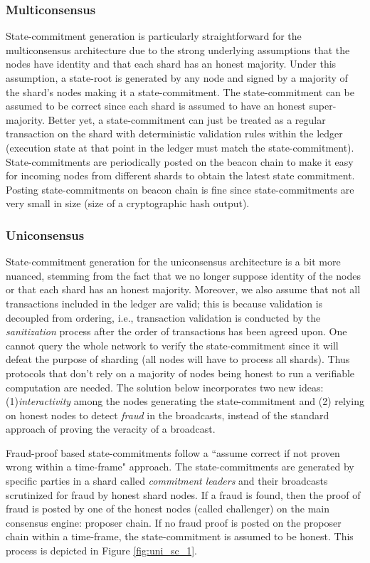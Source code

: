 \documentclass{article}
\begin{document}
\subsubsection{Multiconsensus}
State-commitment generation is particularly straightforward for the multiconsensus architecture due to the strong underlying assumptions that the nodes have identity and that each shard has an honest majority. Under this assumption, a state-root is generated by any node and signed by a majority of the shard’s nodes making it a state-commitment. The state-commitment can be assumed to be correct since each shard is assumed to have an honest super-majority. Better yet, a state-commitment can just be treated as a regular transaction on the shard with deterministic validation rules within the ledger (execution state at that point in the ledger must match the state-commitment). State-commitments are periodically posted on the beacon chain to make it easy for incoming nodes from different shards to obtain the latest state commitment. Posting state-commitments on beacon chain is fine since state-commitments are very small in size (size of a cryptographic hash output). 


\subsubsection{Uniconsensus}
State-commitment generation for the uniconsensus architecture is a bit more nuanced, stemming from the fact that we no longer suppose identity of the nodes or that each shard has an honest majority. Moreover, we also assume that not all transactions included in the ledger are valid; this is because validation is decoupled from ordering, i.e.,  transaction validation is conducted by the {\em sanitization} process after the order of transactions has been agreed upon. One cannot query the whole network to verify the state-commitment since it will defeat the purpose of sharding (all nodes will have to process all shards). Thus protocols that don't rely on a majority of nodes being honest to run a verifiable computation are needed. The solution below incorporates two new ideas: (1){\em interactivity}  among the nodes generating the state-commitment and (2) relying on honest nodes to detect  {\em fraud} in the broadcasts,  instead of the standard approach of proving the veracity of a broadcast. 

Fraud-proof based state-commitments follow a ``assume correct if not proven wrong within a time-frame" approach. The state-commitments are generated by specific parties in a shard called {\em commitment leaders} and their broadcasts scrutinized for fraud by honest shard nodes.  If a fraud is found, then the proof of fraud is posted by one of the honest nodes (called challenger) on the main consensus engine: proposer chain. If no fraud proof is posted on the proposer chain within a time-frame, the state-commitment is assumed to be honest. This process is depicted in Figure \ref{fig:uni_sc_1}. 
\end{document}
